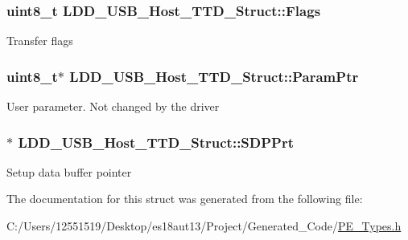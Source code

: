 \subsubsection[{Flags}]{\setlength{\rightskip}{0pt plus 5cm}uint8\+\_\+t L\+D\+D\+\_\+\+U\+S\+B\+\_\+\+Host\+\_\+\+T\+T\+D\+\_\+\+Struct\+::\+Flags}\label{struct_l_d_d___u_s_b___host___t_t_d___struct_a083f54cb9e59a2206aca7d5481154c27}
Transfer flags \hypertarget{struct_l_d_d___u_s_b___host___t_t_d___struct_ab6fd6fdfe1e3e43cbdb5e1f2f61b3265}{}
\subsubsection[{Param\+Ptr}]{\setlength{\rightskip}{0pt plus 5cm}uint8\+\_\+t$\ast$ L\+D\+D\+\_\+\+U\+S\+B\+\_\+\+Host\+\_\+\+T\+T\+D\+\_\+\+Struct\+::\+Param\+Ptr}\label{struct_l_d_d___u_s_b___host___t_t_d___struct_ab6fd6fdfe1e3e43cbdb5e1f2f61b3265}
User parameter. Not changed by the driver \hypertarget{struct_l_d_d___u_s_b___host___t_t_d___struct_af1881ea197419558fdb55dc5f98ee446}{}
\subsubsection[{S\+D\+P\+Prt}]{$\ast$ L\+D\+D\+\_\+\+U\+S\+B\+\_\+\+Host\+\_\+\+T\+T\+D\+\_\+\+Struct\+::\+S\+D\+P\+Prt}\label{struct_l_d_d___u_s_b___host___t_t_d___struct_af1881ea197419558fdb55dc5f98ee446}
Setup data buffer pointer 

The documentation for this struct was generated from the following file\+:\begin{DoxyCompactItemize}
\item 
C\+:/\+Users/12551519/\+Desktop/es18aut13/\+Project/\+Generated\+\_\+\+Code/\hyperlink{_p_e___types_8h}{P\+E\+\_\+\+Types.\+h}\end{DoxyCompactItemize}
